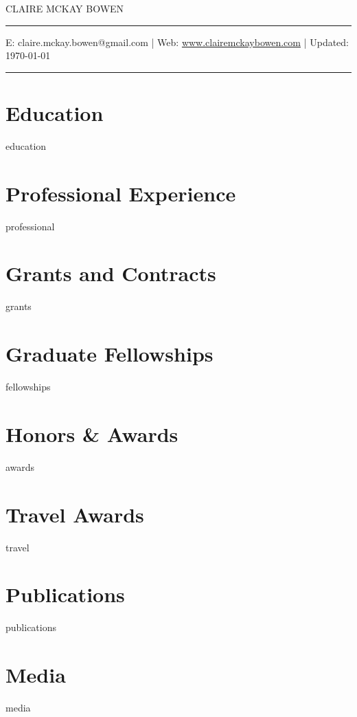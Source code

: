 \documentclass[11pt, letterpaper, roman]{moderncv} %
\begin{document}
\vspace{-10pt}
\centerline{\huge{CLAIRE MCKAY BOWEN}}
\vspace{10pt}
\hrule
\vspace{5pt}
\centerline{\small E: claire.mckay.bowen@gmail.com | Web: \href{https://www.clairemckaybowen.com}{www.clairemckaybowen.com} | Updated: \today}
\vspace{5pt}
\hrule

\section{Education}
{education}

\vspace{-10pt}
\section{Professional Experience}
{professional}
    
\vspace{-30pt}
\section{Grants and Contracts}
{grants}

\section{Graduate Fellowships}
{fellowships}

\section{Honors \& Awards}
{awards}

\section{Travel Awards}
{travel}
    
\newpage
\section{Publications}
{publications}

\section{Media}
{media}
\end{document}
